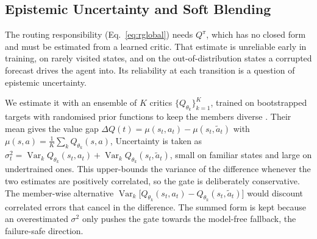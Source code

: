\documentclass{article} %
\begin{document}
\subsection{Epistemic Uncertainty and Soft Blending}

The routing responsibility (Eq.~\ref{eq:rglobal}) needs $Q^{\pi}$, which has no closed form and must be estimated from a learned critic. That estimate is unreliable early in training, on rarely visited states, and on the out-of-distribution states a corrupted forecast drives the agent into. Its reliability at each transition is a question of epistemic uncertainty.

We estimate it with an ensemble of $K$ critics $\{Q_{\theta_k}\}_{k=1}^{K}$, trained on bootstrapped targets with randomised prior functions to keep the members diverse \citep{osband2016deep, osband2018randomized}. Their mean gives the value gap $\Delta Q(t)=\mu(s_t,a_t)-\mu(s_t,\tilde{a}_t)$ with $\mu(s,a)=\tfrac{1}{K}\sum_{k} Q_{\theta_k}(s,a)$, Uncertainty is taken as $\sigma^2_t=\operatorname{Var}_{k} Q_{\theta_k}(s_t,a_t)+\operatorname{Var}_{k} Q_{\theta_k}(s_t,\tilde{a}_t)$, small on familiar states and large on undertrained ones. This upper-bounds the variance of the difference whenever the two estimates are positively correlated, so the gate is deliberately conservative. The member-wise alternative $\operatorname{Var}_{k}\!\big[Q_{\theta_k}(s_t,a_t)-Q_{\theta_k}(s_t,\tilde{a}_t)\big]$ would discount correlated errors that cancel in the difference. The summed form is kept because an overestimated $\sigma^2$ only pushes the gate towards the model-free fallback, the failure-safe direction.
\end{document}
